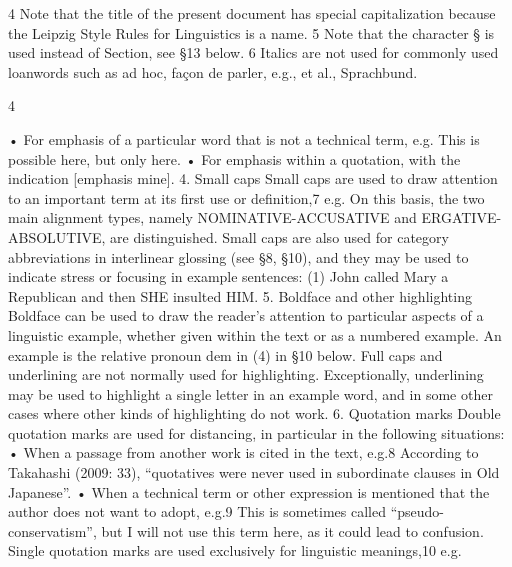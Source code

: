  	
 	
 	
 	
 	
 	
 	
 	
 	
 	
 	
 	
 	
 	
	
 
4
Note that the title of the present document has special capitalization because the Leipzig Style Rules
for Linguistics is a name.
5	
 Note that the character § is used instead of Section, see §13 below.
6	
 Italics are not used for commonly used loanwords such as ad hoc, façon de parler, e.g., et al., Sprachbund.
	
 
	
 
 4	
  
• For emphasis of a particular word that is not a technical term, e.g.
This is possible here, but only here.
• For emphasis within a quotation, with the indication [emphasis mine].
4. Small caps
Small caps are used to draw attention to an important term at its first use or definition,7
e.g.
On this basis, the two main alignment types, namely NOMINATIVE-ACCUSATIVE and ERGATIVE-
ABSOLUTIVE, are distinguished.
Small caps are also used for category abbreviations in interlinear glossing (see §8, §10), and
they may be used to indicate stress or focusing in example sentences:
(1) John called Mary a Republican and then SHE insulted HIM.
5. Boldface and other highlighting
Boldface can be used to draw the reader’s attention to particular aspects of a linguistic
example, whether given within the text or as a numbered example. An example is the
relative pronoun dem in (4) in §10 below.
Full caps and underlining are not normally used for highlighting. Exceptionally,
underlining may be used to highlight a single letter in an example word, and in some other
cases where other kinds of highlighting do not work.
6. Quotation marks
Double quotation marks are used for distancing, in particular in the following situations:
• When a passage from another work is cited in the text, e.g.8
According to Takahashi (2009: 33), “quotatives were never used in subordinate clauses in Old
Japanese”.
• When a technical term or other expression is mentioned that the author does not
want to adopt, e.g.9
This is sometimes called “pseudo-conservatism”, but I will not use this term here, as it could lead to
confusion.
Single quotation marks are used exclusively for linguistic meanings,10 e.g.
	
 	
 	
 	
 	
